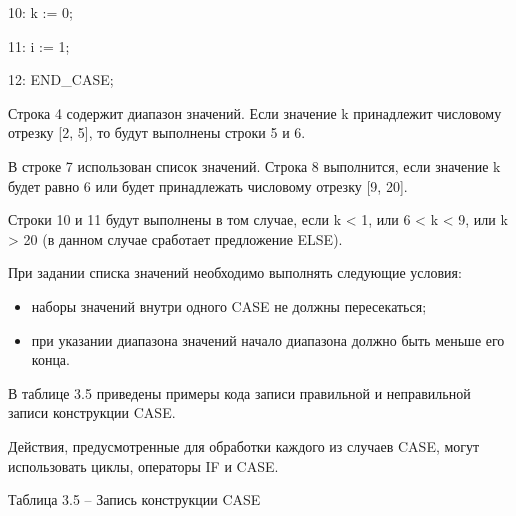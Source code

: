 \documentclass[letterpaper,10pt,russian]{sphinxmanual}
\begin{document}
10: k := 0;

11: i := 1;

12: END\_CASE;

Строка 4 содержит диапазон значений. Если значение k принадлежит
числовому отрезку {[}2, 5{]}, то будут выполнены строки 5 и 6.

В строке 7 использован список значений. Строка 8 выполнится, если
значение k будет равно 6 или будет принадлежать числовому отрезку {[}9,
20{]}.

Строки 10 и 11 будут выполнены в том случае, если k \textless{} 1, или 6 \textless{} k \textless{} 9,
или k \textgreater{} 20 (в данном случае сработает предложение ELSE).

При задании списка значений необходимо выполнять следующие условия:
\begin{itemize}
\item {} 
наборы значений внутри одного CASE не должны пересекаться;

\item {} 
при указании диапазона значений начало диапазона должно быть меньше
его конца.

\end{itemize}

В таблице 3.5 приведены примеры кода записи правильной и неправильной
записи конструкции CASE.

Действия, предусмотренные для обработки каждого из случаев CASE, могут
использовать циклы, операторы IF и CASE.

Таблица 3.5 – Запись конструкции CASE
\end{document}
